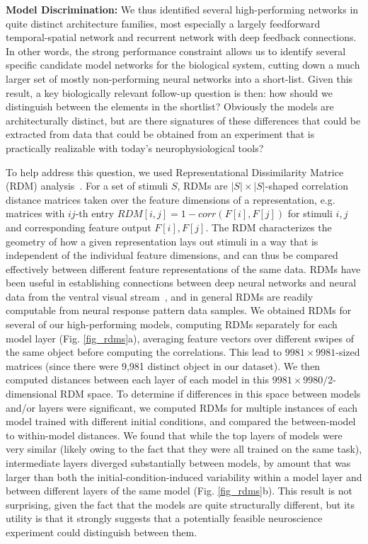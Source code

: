 \textbf{Model Discrimination:}  We thus identified several high-performing networks in quite distinct architecture families, most especially a largely feedforward temporal-spatial network and recurrent network with deep feedback connections. 
In other words, the strong performance constraint allows us to identify several specific candidate model networks for the biological system, cutting down a much larger set of mostly non-performing neural networks into a short-list. 
Given this result, a key biologically relevant follow-up question is then: how should we distinguish between the elements in the shortlist?   
Obviously the models are architecturally distinct, but are there signatures of these differences that could be extracted from data that could be obtained from an experiment that is practically realizable with today's neurophysiological tools? 

To help address this question, we used Representational Dissimilarity Matrice (RDM) analysis~\cite{Kriegeskorte2008}. 
For a set of stimuli $S$, RDMs are $|S| \times |S|$-shaped correlation distance matrices taken over the feature dimensions of a representation, e.g. matrices with $ij$-th entry $RDM[i, j] = 1 - corr(F[i], F[j])$ for stimuli $i, j$ and corresponding feature output $F[i], F[j]$.  
The RDM characterizes the geometry of how a given representation lays out stimuli in a way that is independent of the individual feature dimensions, and can thus be compared effectively between different feature representations of the same data.
RDMs have been useful in establishing connections between deep neural networks and neural data from the ventral visual stream~\cite{cadieu2014deep, Yamins2014, khaligh2014deep}, and in general RDMs are readily computable from neural response pattern data samples. 
We obtained RDMs for several of our high-performing models, computing RDMs separately for each model layer (Fig. \ref{fig_rdms}a), averaging feature vectors over different swipes of the same object before computing the correlations.
This lead to $9981\times9981$-sized matrices (since there were 9,981 distinct object in our dataset).
We then computed distances between each layer of each model in this $9981\times9980/2$-dimensional RDM space. 
To determine if differences in this space between models and/or layers were significant, we computed RDMs for multiple instances of each model trained with different initial conditions, and compared the between-model to within-model distances.  
We found that while the top layers of models were very similar (likely owing to the fact that they were all trained on the same task), intermediate layers diverged substantially between models, by amount that was larger than both the initial-condition-induced variability within a model layer and between different layers of the same model (Fig. \ref{fig_rdms}b).
This result is not surprising, given the fact that the models are quite structurally different, but its utility is that it strongly suggests that a potentially feasible neuroscience experiment could distinguish between them. 



